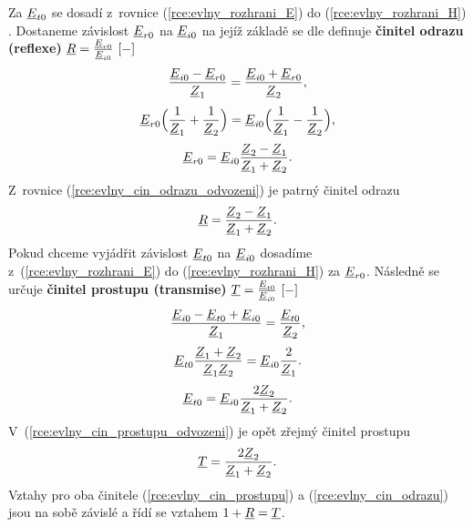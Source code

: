Za ${\underline{E}}_{t0}$ se dosadí z~rovnice (\ref{rce:evlny_rozhrani_E}) do (\ref{rce:evlny_rozhrani_H}) . Dostaneme závislost ${\underline{E}}_{r0}$ na ${\underline{E}}_{i0}$ na jejíž základě se dle \cite{emp} definuje {\bf činitel odrazu (reflexe)}  ${\underline{R}} = \frac{{\underline{E}}_{r0}}{{\underline{E}}_{i0}}\mathrm{\ [-]}$
\begin{displaymath}
	\frac{{\underline{E}}_{i0}-{\underline{E}}_{r0}}{{\underline{Z}}_{1}} = \frac{{\underline{E}}_{i0} + {\underline{E}}_{r0}}{{\underline{Z}}_{2}},
\end{displaymath}
\begin{displaymath}
	{\underline{E}}_{r0}\Big( \frac{1}{{\underline{Z}}_{1}} + \frac{1}{{\underline{Z}}_{2}} \Big) = {\underline{E}}_{i0}\Big( \frac{1}{{\underline{Z}}_{1}} - \frac{1}{{\underline{Z}}_{2}} \Big),
\end{displaymath}
\begin{equation}
	{\underline{E}}_{r0} = {\underline{E}}_{i0} \frac{{\underline{Z}}_{2}-{\underline{Z}}_{1}}{{\underline{Z}}_{1}+{\underline{Z}}_{2}}.
	\label{rce:evlny_cin_odrazu_odvozeni}
\end{equation}
Z~rovnice (\ref{rce:evlny_cin_odrazu_odvozeni}) je patrný činitel odrazu
\begin{equation}
	{\underline{R}} = \frac{{\underline{Z}}_{2}-{\underline{Z}}_{1}}{{\underline{Z}}_{1}+{\underline{Z}}_{2}}.
	\label{rce:evlny_cin_odrazu}
\end{equation}
Pokud chceme vyjádřit závislost ${\underline{E}}_{t0}$ na ${\underline{E}}_{i0}$ dosadíme z~(\ref{rce:evlny_rozhrani_E}) do (\ref{rce:evlny_rozhrani_H}) za ${\underline{E}}_{r0}$. Následně se určuje {\bf činitel prostupu (transmise)}  ${\underline{T}} = \frac{{\underline{E}}_{t0}}{{\underline{E}}_{i0}}\mathrm{\ [-]}$ 
\begin{displaymath}
	\frac{{\underline{E}}_{i0}-{\underline{E}}_{t0}+{\underline{E}}_{i0}}{{\underline{Z}}_{1}} = \frac{{\underline{E}}_{t0}}{{\underline{Z}}_{2}},
\end{displaymath}
\begin{displaymath}
	{\underline{E}}_{t0} \frac{{\underline{Z}}_{1}+{\underline{Z}}_{2}}{{\underline{Z}}_{1}{\underline{Z}}_{2}} = {\underline{E}}_{i0} \frac{2}{{\underline{Z}}_{1}}.
\end{displaymath}
\begin{equation}
	{\underline{E}}_{t0} = {\underline{E}}_{i0} \frac{2{\underline{Z}}_{2}}{{\underline{Z}}_{1}+{\underline{Z}}_{2}}.
	\label{rce:evlny_cin_prostupu_odvozeni}
\end{equation}
V~(\ref{rce:evlny_cin_prostupu_odvozeni}) je opět zřejmý činitel prostupu
\begin{equation}
	{\underline{T}} = \frac{2{\underline{Z}}_{2}}{{\underline{Z}}_{1}+{\underline{Z}}_{2}}.
	\label{rce:evlny_cin_prostupu}
\end{equation}
Vztahy pro oba činitele (\ref{rce:evlny_cin_prostupu}) a (\ref{rce:evlny_cin_odrazu}) jsou na sobě závislé a řídí se vztahem $1 + {\underline{R}} = {\underline{T}}$.


